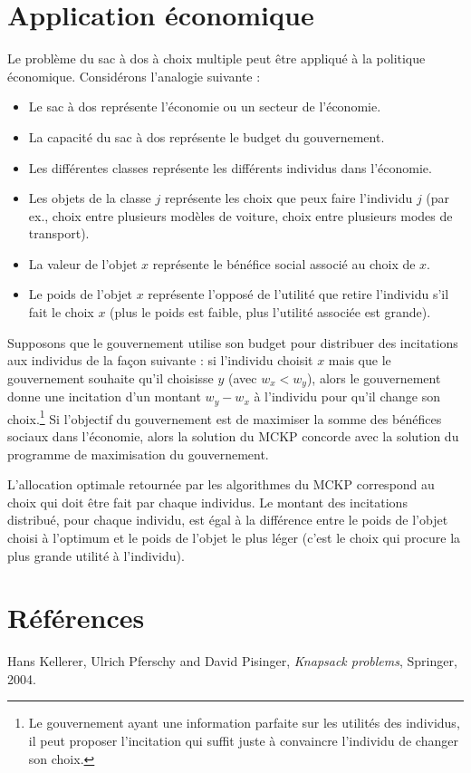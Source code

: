 \documentclass{article}
\begin{document}
\section{Application économique}

Le problème du sac à dos à choix multiple peut être appliqué à la politique économique.
Considérons l'analogie suivante :
\begin{itemize}
	\item Le sac à dos représente l'économie ou un secteur de l'économie.
	\item La capacité du sac à dos représente le budget du gouvernement.
	\item Les différentes classes représente les différents individus dans l'économie.
	\item Les objets de la classe $j$ représente les choix que peux faire l'individu $j$ (par ex., choix entre plusieurs modèles de voiture, choix entre plusieurs modes de transport).
	\item La valeur de l'objet $x$ représente le bénéfice social associé au choix de $x$.
	\item Le poids de l'objet $x$ représente l'opposé de l'utilité que retire l'individu s'il fait le choix $x$ (plus le poids est faible, plus l'utilité associée est grande).
\end{itemize}

Supposons que le gouvernement utilise son budget pour distribuer des incitations aux individus de la façon suivante : si l'individu choisit $x$ mais que le gouvernement souhaite qu'il choisisse $y$ (avec $w_x < w_y$), alors le gouvernement donne une incitation d'un montant $w_y - w_x$ à l'individu pour qu'il change son choix.\footnote{Le gouvernement ayant une information parfaite sur les utilités des individus, il peut proposer l'incitation qui suffit juste à convaincre l'individu de changer son choix.}
Si l'objectif du gouvernement est de maximiser la somme des bénéfices sociaux dans l'économie, alors la solution du MCKP concorde avec la solution du programme de maximisation du gouvernement.

L'allocation optimale retournée par les algorithmes du MCKP correspond au choix qui doit être fait par chaque individus.
Le montant des incitations distribué, pour chaque individu, est égal à la différence entre le poids de l'objet choisi à l'optimum et le poids de l'objet le plus léger (c'est le choix qui procure la plus grande utilité à l'individu).

\section{Références}

\begin{thebibliography}{9}
  Hans Kellerer, Ulrich Pferschy and David Pisinger,
  \textit{Knapsack problems},
  Springer,
  2004.
\end{thebibliography}
\end{document}
